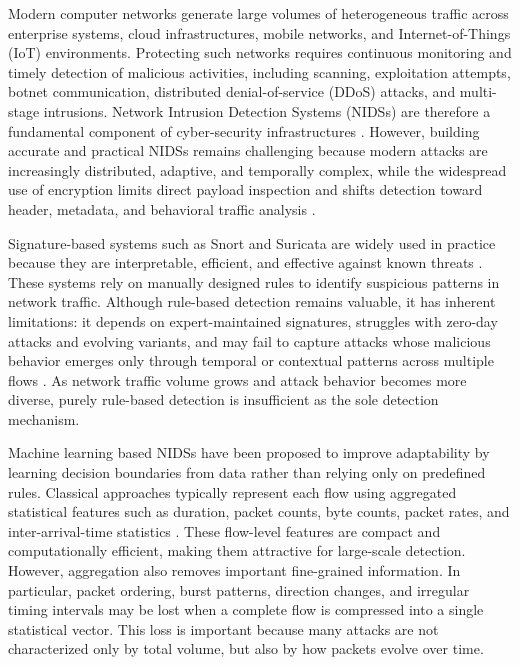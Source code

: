 \documentclass[11pt,fleqn]{report}
\begin{document}
Modern computer networks generate large volumes of heterogeneous traffic across enterprise systems, cloud infrastructures, mobile networks, and Internet-of-Things (IoT) environments. Protecting such networks requires continuous monitoring and timely detection of malicious activities, including scanning, exploitation attempts, botnet communication, distributed denial-of-service (DDoS) attacks, and multi-stage intrusions. Network Intrusion Detection Systems (NIDSs) are therefore a fundamental component of cyber-security infrastructures \cite{Roesch1999,SommerPaxson2010}. However, building accurate and practical NIDSs remains challenging because modern attacks are increasingly distributed, adaptive, and temporally complex, while the widespread use of encryption limits direct payload inspection and shifts detection toward header, metadata, and behavioral traffic analysis \cite{Sharma2025EncryptedSurvey,Dong2025EncryptedPretrain}.

Signature-based systems such as Snort and Suricata are widely used in practice because they are interpretable, efficient, and effective against known threats \cite{Roesch1999,SuricataGuide2026}. These systems rely on manually designed rules to identify suspicious patterns in network traffic. Although rule-based detection remains valuable, it has inherent limitations: it depends on expert-maintained signatures, struggles with zero-day attacks and evolving variants, and may fail to capture attacks whose malicious behavior emerges only through temporal or contextual patterns across multiple flows \cite{SommerPaxson2010,Hozouri2025Survey}. As network traffic volume grows and attack behavior becomes more diverse, purely rule-based detection is insufficient as the sole detection mechanism.

Machine learning based NIDSs have been proposed to improve adaptability by learning decision boundaries from data rather than relying only on predefined rules. Classical approaches typically represent each flow using aggregated statistical features such as duration, packet counts, byte counts, packet rates, and inter-arrival-time statistics \cite{BuczakGuven2016,Ahmed2016Survey}. These flow-level features are compact and computationally efficient, making them attractive for large-scale detection. However, aggregation also removes important fine-grained information. In particular, packet ordering, burst patterns, direction changes, and irregular timing intervals may be lost when a complete flow is compressed into a single statistical vector. This loss is important because many attacks are not characterized only by total volume, but also by how packets evolve over time.
\end{document}
